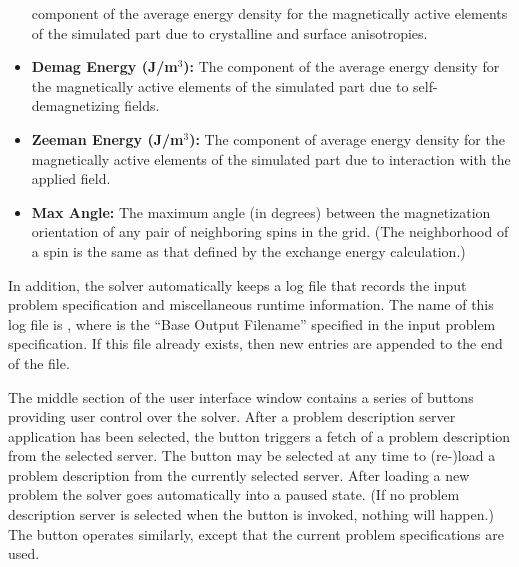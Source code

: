 \begin{itemize}
        component of the average energy density for the magnetically
        active elements of the simulated part due to crystalline and
        surface anisotropies.
\item {\bf Demag Energy (J/m${}^3$):} The component
        of the average energy density for the magnetically active
        elements of the simulated part due to self-demagnetizing fields.
\item {\bf Zeeman Energy (J/m${}^3$):}  The
        component of average energy density for the magnetically active
        elements of the simulated part due to interaction with the
        applied field.
\item {\bf Max Angle:}  The maximum angle (in degrees)
        between the magnetization orientation of any pair of neighboring
        spins in the grid.  (The neighborhood of a spin is the same as
        that defined by the exchange energy calculation.)
\end{itemize}
In addition, the solver automatically keeps a log file
that records the input problem specification and miscellaneous runtime
information.  The name of this log file is ,
where  is the ``Base Output Filename'' specified
in the input problem specification.  If this file already exists, then
new entries are appended to the end of the file.

The middle section of the user interface window contains a series of
buttons providing user control over the
solver.  After a problem
description server application has been selected, the 
button triggers a fetch of a problem description from the selected
server.  The  button may be selected at any time to
(re-)load a problem description from the currently selected server.
After loading a new problem the solver goes automatically into a paused
state.  (If no problem description server is selected when the
 button is invoked, nothing will happen.)  The
 button operates similarly, except that the current problem
specifications are used.

